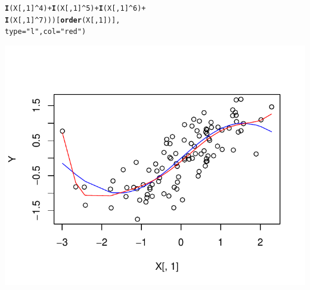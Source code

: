 \documentclass[a4paper]{article}
\makeatletter
\def\maxwidth{ %
  \ifdim\Gin@nat@width>\linewidth
    \linewidth
  \else
    \Gin@nat@width
  \fi
}
\newcommand{\hlnum}[1]{\textcolor[rgb]{0.686,0.059,0.569}{#1}}%
\newcommand{\hlstr}[1]{\textcolor[rgb]{0.192,0.494,0.8}{#1}}%
\newcommand{\hlopt}[1]{\textcolor[rgb]{0,0,0}{#1}}%
\newcommand{\hlstd}[1]{\textcolor[rgb]{0.345,0.345,0.345}{#1}}%
\newcommand{\hlkwc}[1]{\textcolor[rgb]{0.333,0.667,0.333}{#1}}%
\newcommand{\hlkwd}[1]{\textcolor[rgb]{0.737,0.353,0.396}{\textbf{#1}}}%
\newenvironment{kframe}{%
 \def\at@end@of@kframe{}%
 \ifinner\ifhmode%
  \def\at@end@of@kframe{\end{minipage}}%
  \begin{minipage}{\columnwidth}%
 \fi\fi%
 \def\FrameCommand##1{\hskip\@totalleftmargin \hskip-\fboxsep
 \colorbox{shadecolor}{##1}\hskip-\fboxsep
     \hskip-\linewidth \hskip-\@totalleftmargin \hskip\columnwidth}%
 \MakeFramed {\advance\hsize-\width
   \@totalleftmargin\z@ \linewidth\hsize
   \@setminipage}}%
 {\par\unskip\endMakeFramed%
 \at@end@of@kframe}
\newenvironment{knitrout}{}{} %
\makeatother
\begin{document}
{\begin{enumerate}
\begin{itemize}
\begin{knitrout}
\begin{kframe}
\begin{alltt}
                        \hlkwd{I}\hlstd{(X[,}\hlnum{1}\hlstd{]}\hlopt{^}\hlnum{4}\hlstd{)} \hlopt{+} \hlkwd{I}\hlstd{(X[,}\hlnum{1}\hlstd{]}\hlopt{^}\hlnum{5}\hlstd{)} \hlopt{+} \hlkwd{I}\hlstd{(X[,}\hlnum{1}\hlstd{]}\hlopt{^}\hlnum{6}\hlstd{)} \hlopt{+}
                        \hlkwd{I}\hlstd{(X[,}\hlnum{1}\hlstd{]}\hlopt{^}\hlnum{7}\hlstd{)))[}\hlkwd{order}\hlstd{(X[,}\hlnum{1}\hlstd{])],}
       \hlkwc{type}\hlstd{=}\hlstr{"l"}\hlstd{,} \hlkwc{col}\hlstd{=}\hlstr{"red"}\hlstd{)}
\end{alltt}
\end{kframe}
\includegraphics[width=\maxwidth]{figure/unnamed-chunk-4-1} 
\end{knitrout}


\end{itemize}
\end{enumerate}}
\end{document}
